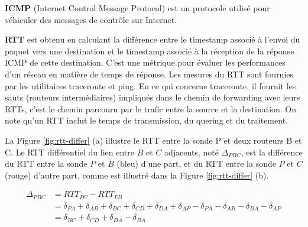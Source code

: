 \begin{tcolorbox}
	
	\textbf{ICMP} (Internet Control Message Protocol) est un protocole utilisé pour véhiculer des messages de contrôle sur Internet.
	
	\textbf{RTT} est obtenu en calculant la différence entre le timestamp associé à l'envoi du paquet vers une destination  et le timestamp associé à la réception de la réponse ICMP de cette destination. C'est une métrique pour évaluer les performances d'un réseau en matière de temps de réponse. Les mesures du RTT sont fournies par les utilitaires traceroute et ping. En ce qui concerne traceroute,  il fournit les sauts (routeurs intermédiaires) impliqués dans le  chemin de forwarding avec leurs RTTs, c'est le chemin parcouru par le trafic entre la source et la destination. On note qu'un  RTT inclut le temps de transmission, du quering et  du traitement. 
\end{tcolorbox}

La Figure 	\ref{fig:rtt-differ} (a)  illustre le RTT entre la sonde P et deux routeurs B et C. Le RTT différentiel  du lien entre  $B$ et $C$ adjacents, noté $\Delta_{PBC}$, est la différence du RTT entre la sonde $P$ et $B$ (bleu) d'une part, et du RTT entre la sonde $P$ et $C$  (rouge) d'autre part, comme est  illustré dans la Figure	\ref{fig:rtt-differ} (b). 


\begin{align*}
\Delta_{PBC} &= RTT_{PC} - RTT_{PB} \\ 
&= \delta_{PA} + \delta_{AB} + \delta_{BC} + \delta_{CD} + \delta_{DA}+ \delta_{AP} - \delta_{PA} - \delta_{AB}- \delta_{BA} - \delta_{AP} \\
&=  \delta_{BC} + \delta_{CD} + \delta_{DA}- \delta_{BA} \\
\end{align*}

